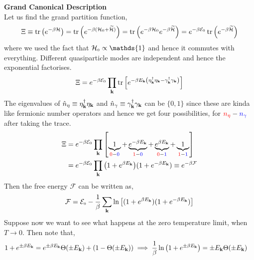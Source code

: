 \documentclass{article}
\newcommand{\tund}[1]{_{\text{\tiny #1}}}
\newcommand{\SE}{\mathcal{E}}
\newcommand{\SH}{\mathcal{H}}
\newcommand{\SF}{\mathcal{F}}
\newcommand{\vk}{\vb{k}}
\newcommand{\ek}{\eta_{\vk}}
\newcommand{\gk}{\gamma_{\vk}}
\begin{document}
\textbf{\large Grand Canonical Description}\\[0.2cm]
Let us find the grand partition function,
\begin{equation}
    \Xi \equiv \tr\qty(e^{-\beta \SH}) = \tr\qty(e^{-\beta (\SH\tund{0}+\widetilde{\SH})}) = \tr\qty(e^{-\beta \SH\tund{0}}e^{-\beta \widetilde{\SH}}) = e^{-\beta \SE\tund{0}}\tr\qty(e^{-\beta \widetilde{\SH}})
\end{equation}
where we used the fact that $\SH\tund{0}\propto\mathds{1}$ and hence it commutes with everything. Different quasiparticle modes are independent and hence the exponential factorises.
\begin{equation}
    \begin{split}
        \Xi = e^{-\beta \SE\tund{0}}\prod\limits_{\vk}\tr\qty[e^{-\beta E_{\vk}\qty(\ek^\dagger\ek - \gk^\dagger\gk)}]
    \end{split}
\end{equation}
The eigenvalues of $\hat{n}_{\eta} \equiv \ek^\dagger\ek$ and $\hat{n}_{\gamma} \equiv\gk^\dagger\gk$ can be $\{0,1\}$ since these are kinda like fermionic number operators and hence we get four possibilities, for $\mathcolor{red}{n_{\eta}} - \mathcolor{blue}{n_{\gamma}}$ after taking the trace.
\begin{equation}
   \begin{split}
     \Xi &=  e^{-\beta \SE\tund{0}}\prod\limits_{\vk}\qty[\underbrace{1}_{\mathcolor{red}{0} - \mathcolor{blue}{0}} + \underbrace{e^{-\beta E_{\vk}}}_{{\mathcolor{red}{1} - \mathcolor{blue}{0}}} + \underbrace{e^{\beta E_{\vk}}}_{\mathcolor{red}{0} - \mathcolor{blue}{1}}+\underbrace{1}_{\mathcolor{red}{1} - \mathcolor{blue}{1}}]\\
    &= e^{-\beta \SE\tund{0}}\prod\limits_{\vk}\qty(1+e^{\beta E_{\vk}})(1+e^{-\beta E_{\vk}})\equiv e^{-\beta \SF}
   \end{split}
\end{equation}
Then the free energy $\SF$ can be written as, 
\begin{equation}
    \SF = \SE\tund{0} - \frac{1}{\beta}\sum\limits_{\vk}\ln\qty[(1+e^{\beta E_{\vk}})(1+e^{-\beta E_{\vk}})]
\end{equation}
Suppose now we want to see what happens at the zero temperature limit, when $T\to 0$. Then note that, 
\begin{align}
    1 + e^{ \pm \beta E_{\vk}} &= e^{\pm\beta E_{\vk}}\Theta(\pm E_{\vk}) + (1-\Theta(\pm E_{\vk})) \implies \frac{1}{\beta}\ln\qty(1 + e^{ \pm \beta E_{\vk}}) = \pm E_{\vk}\Theta(\pm E_{\vk})
\end{align}
\end{document}
